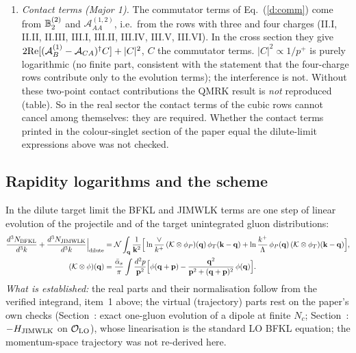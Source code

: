 \begin{enumerate}
\item \emph{Contact terms (Major 1).} The commutator terms of Eq.~(\ref{d:comm}) come from $\mathbb{B}_2^{(2)}$ and $\mathcal A_{AA}^{(1,2)}$, i.e.\ from the rows with three and four charges (II.I, II.II, II.III, III.I, III.II, III.IV, III.V, III.VI). In the cross section they give $2{\rm Re}[(\mathcal A_B^{(1)}-\mathcal A_{CA})^\dagger C]+|C|^2$, $C$ the commutator terms. $|C|^2\propto1/p^+$ is purely logarithmic (no finite part, consistent with the statement that the four-charge rows contribute only to the evolution terms); the interference is not. Without these two-point contact contributions the QMRK result is \emph{not} reproduced (table). So in the real sector the contact terms of the cubic rows cannot cancel among themselves: they are required. Whether the contact terms printed in the colour-singlet section of the paper equal the dilute-limit expressions above was not checked.
\end{enumerate}

\subsection{Rapidity logarithms and the scheme}\label{sec:d-logs}
In the dilute target limit the BFKL and JIMWLK terms are one step of linear evolution of the projectile and of the target unintegrated gluon distributions:
\begin{align}
\frac{d^3N_{\rm BFKL}}{d^3k}+\frac{d^3N_{\rm JIMWLK}}{d^3k}\Big|_{\rm dilute}&=\mathcal N\int_{\mathbf{q}}\frac{1}{\mathbf{k}^2}\Big[\ln\frac{\vee}{k^+}\,(\mathcal K\otimes\phi_P)(\mathbf{q})\,\phi_T(\mathbf{k}-\mathbf{q})+\ln\frac{k^+}{\Lambda}\,\phi_P(\mathbf{q})\,(\mathcal K\otimes\phi_T)(\mathbf{k}-\mathbf{q})\Big],\notag\\
(\mathcal K\otimes\phi)(\mathbf{q})&=\frac{\bar\alpha_s}{\pi}\int\frac{d^2p}{\mathbf{p}^2}\Big[\phi(\mathbf{q}+\mathbf{p})-\frac{\mathbf{q}^2}{\mathbf{p}^2+(\mathbf{q}+\mathbf{p})^2}\,\phi(\mathbf{q})\Big].\label{d:BFKL}
\end{align}
\emph{What is established:} the real parts and their normalisation follow from the verified integrand, item~1 above; the virtual (trajectory) parts rest on the paper's own checks (Section~: exact one-gluon evolution of a dipole at finite $N_c$; Section~: $-H_{\rm JIMWLK}$ on $\mathcal O_{\rm LO}$), whose linearisation is the standard LO BFKL equation; the momentum-space trajectory was not re-derived here.

